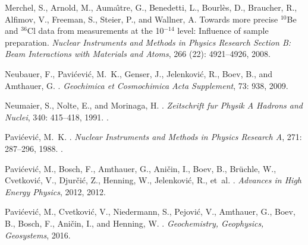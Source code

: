 \documentclass[titlepage]{article}
\begin{document}
\begin{thebibliography}{25}
Merchel, S., Arnold, M., Auma{\^\i}tre, G., Benedetti, L., Bourl{\`e}s, D.,
  Braucher, R., Alfimov, V., Freeman, S., Steier, P., and Wallner, A.
\newblock Towards more precise $^{10}${B}e and $^{36}${C}l data from
  measurements at the 10$^{-14}$ level: Influence of sample preparation.
\newblock \emph{Nuclear Instruments and Methods in Physics Research Section B:
  Beam Interactions with Materials and Atoms}, 266 (22):
  4921--4926, 2008.

{Neubauer}, F., {Pavi{\'c}evi{\'c}}, M.~K., {Genser}, J., {Jelenkovi{\'c}}, R.,
  {Boev}, B., and {Amthauer}, G.
.
\newblock \emph{Geochimica et Cosmochimica Acta Supplement}, 73: 938,
  2009.

{Neumaier}, S., {Nolte}, E., and {Morinaga}, H.
.
\newblock \emph{Zeitschrift fur Physik A Hadrons and Nuclei}, 340:
  415--418, 1991.
\newblock {}.

{Pavi{\'c}evi{\'c}}, M.~K.
.
\newblock \emph{Nuclear Instruments and Methods in Physics Research A},
  271: 287--296, 1988.
\newblock {}.

Pavi{\'c}evi{\'c}, M., Bosch, F., Amthauer, G., Ani{\v{c}}in, I., Boev, B.,
  Br{\"u}chle, W., Cvetkovi{\'c}, V., Djur{\v{c}}i{\'c}, Z., Henning, W.,
  Jelenkovi{\'c}, R., et~al.
.
\newblock \emph{Advances in High Energy Physics}, 2012, 2012.

Pavi{\'c}evi{\'c}, M., Cvetkovi{\'c}, V., Niedermann, S., Pejovi{\'c}, V.,
  Amthauer, G., Boev, B., Bosch, F., Ani{\v{c}}in, I., and Henning, W.
.
\newblock \emph{Geochemistry, Geophysics, Geosystems}, 2016.


\end{thebibliography}
\end{document}
